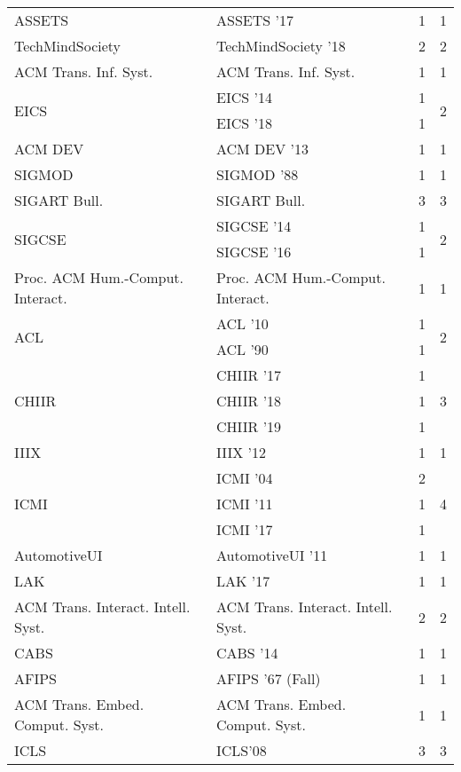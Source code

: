 \begin{table*}[t]
\begin{tabular}{llrr}
\multirow{1}{*}{ASSETS } & ASSETS '17 & 1 & \multirow{1}{*}{1}\\
\multirow{1}{*}{TechMindSociety } & TechMindSociety '18 & 2 & \multirow{1}{*}{2}\\
\multirow{1}{*}{ACM Trans. Inf. Syst.} & ACM Trans. Inf. Syst. & 1 & \multirow{1}{*}{1}\\
\multirow{2}{*}{EICS } & EICS '14 & 1 & \multirow{2}{*}{2}\\
& EICS '18 & 1 &\\
\multirow{1}{*}{ACM DEV } & ACM DEV '13 & 1 & \multirow{1}{*}{1}\\
\multirow{1}{*}{SIGMOD } & SIGMOD '88 & 1 & \multirow{1}{*}{1}\\
\multirow{1}{*}{SIGART Bull.} & SIGART Bull. & 3 & \multirow{1}{*}{3}\\
\multirow{2}{*}{SIGCSE } & SIGCSE '14 & 1 & \multirow{2}{*}{2}\\
& SIGCSE '16 & 1 &\\
\multirow{1}{*}{Proc. ACM Hum.-Comput. Interact.} & Proc. ACM Hum.-Comput. Interact. & 1 & \multirow{1}{*}{1}\\
\multirow{2}{*}{ACL } & ACL '10 & 1 & \multirow{2}{*}{2}\\
& ACL '90 & 1 &\\
\multirow{3}{*}{CHIIR } & CHIIR '17 & 1 & \multirow{3}{*}{3}\\
& CHIIR '18 & 1 &\\
& CHIIR '19 & 1 &\\
\multirow{1}{*}{IIIX } & IIIX '12 & 1 & \multirow{1}{*}{1}\\
\multirow{3}{*}{ICMI } & ICMI '04 & 2 & \multirow{3}{*}{4}\\
& ICMI '11 & 1 &\\
& ICMI '17 & 1 &\\
\multirow{1}{*}{AutomotiveUI } & AutomotiveUI '11 & 1 & \multirow{1}{*}{1}\\
\multirow{1}{*}{LAK } & LAK '17 & 1 & \multirow{1}{*}{1}\\
\multirow{1}{*}{ACM Trans. Interact. Intell. Syst.} & ACM Trans. Interact. Intell. Syst. & 2 & \multirow{1}{*}{2}\\
\multirow{1}{*}{CABS } & CABS '14 & 1 & \multirow{1}{*}{1}\\
\multirow{1}{*}{AFIPS } & AFIPS '67 (Fall) & 1 & \multirow{1}{*}{1}\\
\multirow{1}{*}{ACM Trans. Embed. Comput. Syst.} & ACM Trans. Embed. Comput. Syst. & 1 & \multirow{1}{*}{1}\\
\multirow{1}{*}{ICLS} & ICLS'08 & 3 & \multirow{1}{*}{3}\\

\end{tabular}
\end{table*}
